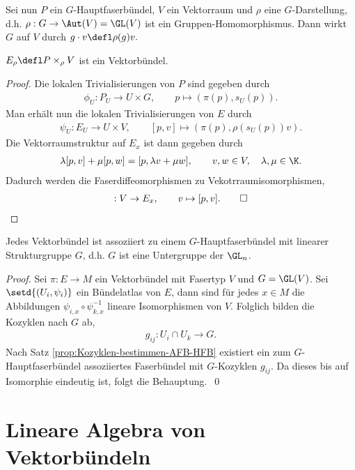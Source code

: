 \documentclass[%
	paper=a5,%
	fleqn,%
	DIV=18,%
	BCOR=0mm,
	fontsize=11pt,
	titlepage=false,%
	bibliography=totoc,
	DIV=18,%
	twoside=true,
	pdftitle=Riemannsche Geometrie,
	pdfauthor=Uwe Semmelmann,
	numbers=noendperiod]%
	{scrbook}
\begin{document}
Sei nun $P$ ein $G$-Hauptfaserbündel, $V$ ein Vektorraum und $\rho$
eine $G$-Darstellung, d.h.
$
\rho: G\to \Aut(V)=\GL(V)
$
ist ein Gruppen-Homomorphismus. Dann wirkt $G$ auf $V$ durch
$
g\cdot v \defl \rho(g)v.
$

\begin{lem}
$E_\rho\defl P\times_\rho V$ ist ein Vektorbündel.\fish
\end{lem}

\begin{proof}
Die lokalen Trivialisierungen von $P$ sind gegeben durch
\begin{align*}
\phi_U : P_U\to U\times G,\qquad p\mapsto (\pi(p),s_U(p)).
\end{align*}
Man erhält nun die lokalen Trivialisierungen von $E$ durch
\begin{align*}
\psi_U : E_U \to U\times V,\qquad
[p,v]\mapsto (\pi(p),\rho(s_U(p))v).
\end{align*}
Die Vektorraumstruktur auf $E_x$ ist dann gegeben durch
\begin{align*}
\lambda[p,v]+\mu[p,w] = [p,\lambda v + \mu w],\qquad
v,w\in V,\quad \lambda,\mu\in\K.
\end{align*}
Dadurch werden die Faserdiffeomorphismen zu Vekotrraumisomorphismen,
\begin{align*}
[p]: V\to E_x,\qquad v\mapsto [p,v].\qed
\end{align*}
\end{proof}

\begin{lem}
\label{lem:VB-assoziert-GLn}
Jedes Vektorbündel ist assoziiert zu einem $G$-Hauptfaserbündel mit linearer
Strukturgruppe $G$, d.h. $G$ ist eine Untergruppe der $\GL_n$.\fish
\end{lem}
\begin{proof}
Sei $\pi: E\to M$ ein Vektorbündel mit Fasertyp $V$ und $G=\GL(V)$. Sei
$\setd{(U_i,\psi_i)}$ ein Bündelatlas von $E$, dann sind für jedes $x\in M$ die
Abbildungen $\psi_{i,x}\circ\psi_{k,x}^{-1}$ lineare Isomorphismen von $V$.
Folglich bilden die Kozyklen nach $G$ ab,
\begin{align*}
g_{ij}: U_i\cap U_k \to G.
\end{align*}
Nach Satz \ref{prop:Kozyklen-bestimmen-AFB-HFB} existiert ein zum $G$-Hauptfaserbündel
assoziiertes Faserbündel mit $G$-Kozyklen $g_{ij}$. Da dieses bis auf Isomorphie
eindeutig ist, folgt die Behauptung.~\qed
\end{proof}

\section{Lineare Algebra von Vektorbündeln}
\end{document}
